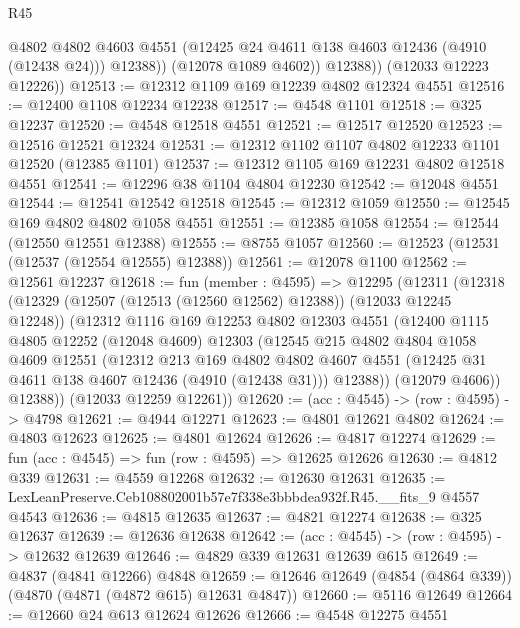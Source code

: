 \begin{lexlean}{R45}
\begin{coremodule}
                @4802
                @4802
                @4603
                @4551
                (@12425 @24 @4611 @138 @4603 @12436 (@4910 (@12438 @24)))
                @12388))
            (@12078 @1089 @4602))
          @12388))
      (@12033 @12223 @12226))
@12513 := @12312 @1109 @169 @12239 @4802 @12324 @4551
@12516 := @12400 @1108 @12234 @12238
@12517 := @4548 @1101
@12518 := @325 @12237
@12520 := @4548 @12518 @4551
@12521 := @12517 @12520
@12523 := @12516 @12521 @12324
@12531 := @12312 @1102 @1107 @4802 @12233 @1101 @12520 (@12385 @1101)
@12537 := @12312 @1105 @169 @12231 @4802 @12518 @4551
@12541 := @12296 @38 @1104 @4804 @12230
@12542 := @12048 @4551
@12544 := @12541 @12542 @12518
@12545 := @12312 @1059
@12550 := @12545 @169 @4802 @4802 @1058 @4551
@12551 := @12385 @1058
@12554 := @12544 (@12550 @12551 @12388)
@12555 := @8755 @1057
@12560 := @12523 (@12531 (@12537 (@12554 @12555) @12388))
@12561 := @12078 @1100
@12562 := @12561 @12237
@12618 := fun (member : @4595) =>
  @12295
    (@12311
      (@12318
        (@12329 (@12507 (@12513 (@12560 @12562) @12388)) (@12033 @12245 @12248))
        (@12312
          @1116
          @169
          @12253
          @4802
          @12303
          @4551
          (@12400
            @1115
            @4805
            @12252
            (@12048 @4609)
            @12303
            (@12545
              @215
              @4802
              @4804
              @1058
              @4609
              @12551
              (@12312
                @213
                @169
                @4802
                @4802
                @4607
                @4551
                (@12425 @31 @4611 @138 @4607 @12436 (@4910 (@12438 @31)))
                @12388))
            (@12079 @4606))
          @12388))
      (@12033 @12259 @12261))
@12620 := (acc : @4545) -> (row : @4595) -> @4798
@12621 := @4944 @12271
@12623 := @4801 @12621 @4802
@12624 := @4803 @12623
@12625 := @4801 @12624
@12626 := @4817 @12274
@12629 := fun (acc : @4545) => fun (row : @4595) => @12625 @12626
@12630 := @4812 @339
@12631 := @4559 @12268
@12632 := @12630 @12631
@12635 := LexLeanPreserve.Ceb108802001b57e7f338e3bbbdea932f.R45.__fits_9 @4557 @4543
@12636 := @4815 @12635
@12637 := @4821 @12274
@12638 := @325 @12637
@12639 := @12636 @12638
@12642 := (acc : @4545) -> (row : @4595) -> @12632 @12639
@12646 := @4829 @339 @12631 @12639 @615
@12649 := @4837 (@4841 @12266) @4848
@12659 := @12646 @12649 (@4854 (@4864 @339)) (@4870 (@4871 (@4872 @615) @12631 @4847))
@12660 := @5116 @12649
@12664 := @12660 @24 @613 @12624 @12626
@12666 := @4548 @12275 @4551

\end{coremodule}
\end{lexlean}
